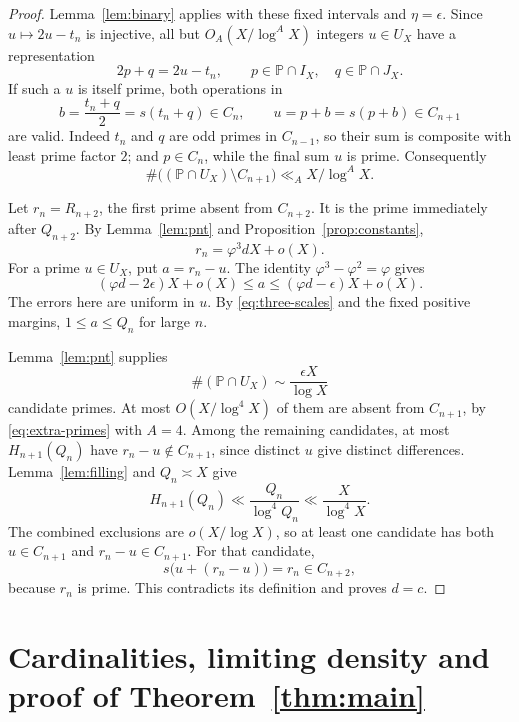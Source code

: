 \documentclass[11pt,letterpaper]{article}
\numberwithin{equation}{section}
\theoremstyle{remark}
\newcommand{\Pp}{\mathbb P}
\newcommand{\ph}{\varphi}
\begin{document}
\begin{proof}
Lemma~\ref{lem:binary} applies with these fixed intervals and
$\eta=\epsilon$. Since $u\mapsto2u-t_n$ is injective, all but
$O_A(X/\log^A X)$ integers $u\in U_X$ have a representation
\begin{equation}\label{eq:bridge}
 2p+q=2u-t_n,\qquad p\in\Pp\cap I_X,\quad q\in\Pp\cap J_X.
\end{equation}
If such a $u$ is itself prime, both operations in
\begin{equation}\label{eq:two-operations}
 b=\frac{t_n+q}{2}=s(t_n+q)\in C_n,
 \qquad u=p+b=s(p+b)\in C_{n+1}
\end{equation}
are valid. Indeed $t_n$ and $q$ are odd primes in $C_{n-1}$,
so their sum is composite with least prime factor $2$; and
$p\in C_n$, while the final sum $u$ is prime. Consequently
\begin{equation}\label{eq:extra-primes}
 \#\bigl((\Pp\cap U_X)\setminus C_{n+1}\bigr)
 \ll_A X/\log^A X.
\end{equation}

Let $r_n=R_{n+2}$, the first prime absent from $C_{n+2}$.
It is the prime immediately after $Q_{n+2}$. By
Lemma~\ref{lem:pnt} and Proposition~\ref{prop:constants},
\begin{equation}\label{eq:first-missing-scale}
 r_n=\ph^3dX+o(X).
\end{equation}
For a prime $u\in U_X$, put $a=r_n-u$. The identity
$\ph^3-\ph^2=\ph$ gives
\[
 (\ph d-2\epsilon)X+o(X)
 \le a\le(\ph d-\epsilon)X+o(X).
\]
The errors here are uniform in $u$. By \eqref{eq:three-scales}
and the fixed positive margins, $1\le a\le Q_n$ for large $n$.

Lemma~\ref{lem:pnt} supplies
\[
 \#(\Pp\cap U_X)\sim\frac{\epsilon X}{\log X}
\]
candidate primes. At most $O(X/\log^4X)$ of them are absent from
$C_{n+1}$, by \eqref{eq:extra-primes} with $A=4$. Among the
remaining candidates, at most $H_{n+1}(Q_n)$ have
$r_n-u\notin C_{n+1}$, since distinct $u$ give distinct differences.
Lemma~\ref{lem:filling} and $Q_n\asymp X$ give
\[
 H_{n+1}(Q_n)\ll\frac{Q_n}{\log^4Q_n}
 \ll\frac{X}{\log^4X}.
\]
The combined exclusions are $o(X/\log X)$, so at least one candidate
has both $u\in C_{n+1}$ and $r_n-u\in C_{n+1}$. For that candidate,
\[
 s\bigl(u+(r_n-u)\bigr)=r_n\in C_{n+2},
\]
because $r_n$ is prime. This contradicts its definition and proves
$d=c$.
\end{proof}

\section{Cardinalities, limiting density and proof of Theorem~\ref{thm:main}}
\end{document}
